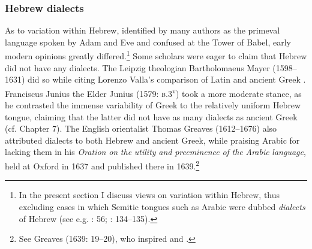 \documentclass[output=paper]{langsci/langscibook}
\begin{document}
\subsubsection{Hebrew dialects}
\hypertarget{Toc19704866}{}
As to variation within Hebrew, identified by many authors as the primeval language spoken by Adam and Eve and confused at the Tower of Babel, early modern opinions greatly differed.\footnote{In the present section I discuss views on variation within Hebrew, thus excluding cases in which Semitic tongues such as Arabic were dubbed \textit{dialects} of Hebrew (see e.g. \citealt{Bochart1646}: 56; \citealt{Martin1737}: 134–135).} Some scholars were eager to claim that Hebrew did not have any dialects. The Leipzig theologian Bartholomaeus Mayer (1598–1631) did so while citing Lorenzo Valla’s comparison of Latin and ancient Greek \citep[10]{Mayer1629}. Franciscus Junius the Elder Junius (1579: \textsc{b.3}\textsc{\textsuperscript{v}}) took a more moderate stance, as he contrasted the immense variability of Greek to the relatively uniform Hebrew tongue, claiming that the latter did not have as many dialects as ancient Greek (cf. Chapter 7). The English orientalist Thomas Greaves (1612–1676) also attributed dialects to both Hebrew and ancient Greek, while praising Arabic for lacking them in his \textit{Oration} \textit{on} \textit{the} \textit{utility} \textit{and} \textit{preeminence} \textit{of} \textit{the} \textit{Arabic} \textit{language}, held at Oxford in 1637 and published there in 1639.\footnote{See Greaves (1639: 19–20), who inspired \citet[60]{Leigh1656} and \citet[73]{Blount1680}.}
\end{document}
